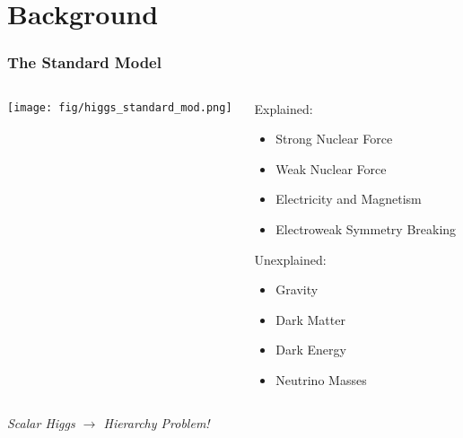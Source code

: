 

\section{Background}
\addtocounter{framenumber}{-1}

\begin{frame}
  \frametitle{The Standard Model}
  \begin{columns}[T]
    \begin{column}{.6\textwidth}
      \texttt{[image: fig/higgs\_standard\_mod.png]}
    \end{column}
    \begin{column}{.4\textwidth}
      Explained:
      \begin{itemize}
        \item Strong Nuclear Force
        \item Weak Nuclear Force
        \item Electricity and Magnetism
        \item Electroweak Symmetry Breaking
      \end{itemize}
      Unexplained:
      \begin{itemize}
        \item Gravity
        \item Dark Matter
        \item Dark Energy
        \item Neutrino Masses
      \end{itemize}
    \end{column}
  \end{columns}
  \emph{Scalar Higgs $\rightarrow$ Hierarchy Problem!}
\end{frame}

